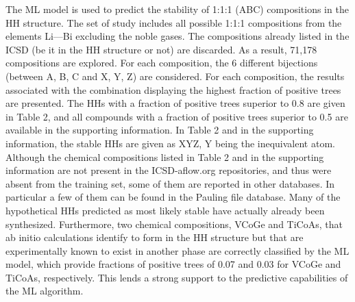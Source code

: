 \documentclass[pt10,journal=jacsat,manuscript=article,layout=twocolumn]{achemso}
\begin{document}
The ML model is used to predict the stability of 1:1:1 (ABC) compositions in the HH structure. The set of study includes all possible 1:1:1 compositions from the elements Li---Bi excluding the noble gases. The compositions already listed in the ICSD (be it in the HH structure or not) are discarded. As a result, 71,178 compositions are explored. For each composition, the 6 different bijections (between A, B, C and X, Y, Z) are considered. For each composition, the results associated with the combination displaying the highest fraction of positive trees are presented. The HHs with a fraction of positive trees superior to 0.8 are given in Table 2, and all compounds with a fraction of positive trees superior to 0.5 are available in the supporting information. In Table 2 and in the supporting information, the stable HHs are given as XYZ, Y being the inequivalent atom. Although the chemical compositions listed in Table 2 and in the supporting information are not present in the ICSD-aflow.org repositories, and thus were absent from the training set, some of them are reported in other databases. In particular a few of them can be found in the Pauling file database\cite{databaseSM}. Many of the hypothetical HHs predicted as most likely stable have actually already been synthesized. Furthermore, two chemical compositions, VCoGe and TiCoAs, that ab initio calculations identify to form in the HH structure but that are experimentally known to exist in another phase\cite{Anovelp-typehalf-Heusler} are correctly classified by the ML model, which provide fractions of positive trees of 0.07 and 0.03 for VCoGe and TiCoAs, respectively. This lends a strong support to the predictive capabilities of the ML algorithm. 
\end{document}
